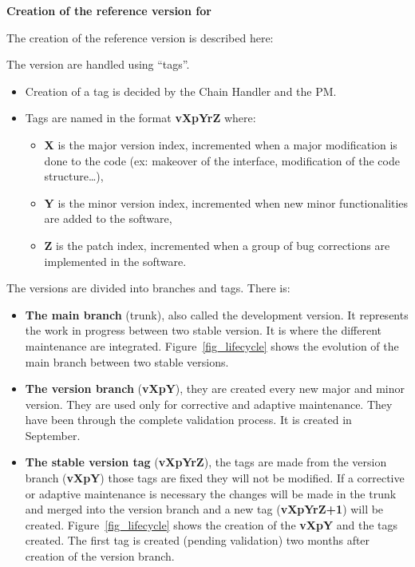 \textbf{Creation of the reference version for \telemacsystem{}}

The creation of the reference version is described here:

The \telemacsystem{} version are handled using ``tags''.
\begin{itemize}
\item Creation of a tag is decided by the Chain Handler and the PM\@.
\item Tags are named in the format \textbf{vXpYrZ} where:
  \begin{itemize}
  \item \textbf{X} is the major version index, incremented when a major
    modification is done to the code (ex: makeover of the interface,
    modification of the code structure\ldots),
  \item \textbf{Y} is the minor version index, incremented when new minor
    functionalities are added to the software,
  \item \textbf{Z} is the patch index, incremented when a group of bug
    corrections are implemented in the software.
  \end{itemize}
\end{itemize}

The versions are divided into branches and tags. There is:
\begin{itemize}
\item \textbf{The main branch} (trunk), also called the development version. It
  represents the work in progress between two stable version. It is where the
  different maintenance are integrated. Figure~\ref{fig_lifecycle} shows the
  evolution of the main branch between two stable versions.
\item \textbf{The version branch} (\textbf{vXpY}), they are created every new
  major and minor version. They are used only for corrective and adaptive
  maintenance. They have been through the complete validation process. It is
  created in September.
\item \textbf{The stable version tag} (\textbf{vXpYrZ}), the tags are made from
  the version branch (\textbf{vXpY}) those tags are fixed they will not be
  modified. If a corrective or adaptive maintenance is necessary the changes
  will be made in the trunk and merged into the version branch and a new tag
  (\textbf{vXpYrZ+1}) will be created. Figure~\ref{fig_lifecycle} shows the
  creation of the \textbf{vXpY} and the tags created. The first tag is created
  (pending validation) two months after creation of the version branch.
\end{itemize}

